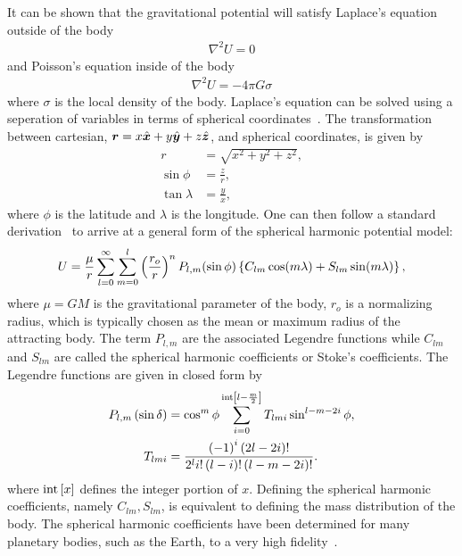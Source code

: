 It can be shown that the gravitational potential will satisfy Laplace's equation outside of the body
\begin{align}
    \nabla^2 U = 0
\end{align}
and Poisson's equation inside of the body
\begin{align}
    \nabla^2 U = - 4 \pi G \sigma
\end{align}
where \( \sigma \) is the local density of the body.
Laplace's equation can be solved using a seperation of variables in terms of spherical coordinates~\cite{scheeres2012a}.
The transformation between cartesian, \( \bm{r} = x \hat{\bm{x}} + y \hat{\bm{y}} + z \hat{\bm{z}}\),  and spherical coordinates, is given by
\begin{subequations}
    \begin{align*}
        r &= \sqrt{x^2 + y^2 + z^2}, \\
        \sin \phi &= \frac{z}{r}, \\
        \tan \lambda &= \frac{y}{x},
    \end{align*}
\end{subequations}
where \( \phi \) is the latitude and \( \lambda\) is the longitude.
One can then follow a standard derivation~\cite{vallado2007} to arrive at a general form of the spherical harmonic potential model:
\begin{align}\label{eq:spherical_harmonic}
    U = \frac{\mu}{r} \sum_{l=0}^\infty \sum_{m=0}^l \left( \frac{r_o}{r} \right)^n P_{l, m}(\sin \phi) \left\{  C_{lm} \cos(m \lambda) + S_{lm} \sin(m \lambda) \right\},
\end{align}
where \( \mu = G M \) is the gravitational parameter of the body, \( r_o\) is a normalizing radius, which is typically chosen as the mean or maximum radius of the attracting body.
The term \( P_{l, m} \) are the associated Legendre functions while \( C_{lm}\) and \( S_{lm}\) are called the spherical harmonic coefficients or Stoke's coefficients. 
The Legendre functions are given in closed form by~\cite{scheeres2012}
\begin{subequations}
\begin{align}
    P_{l, m} \left(  \sin \delta \right) &= \cos^m \phi \sum_{i = 0}^{\text{int}\left[ l - \frac{m}{2} \right]} T_{lmi} \sin^{l - m - 2i} \phi ,  \\
T_{lmi} &= \frac{\left( -1 \right)^i\left( 2l - 2i \right)!}{2^l i! \left( l - i \right)!\left( l - m- 2i \right)!}.
\end{align}
\end{subequations}
where \( \text{int}\left[ x \right]\) defines the integer portion of \( x \).
Defining the spherical harmonic coefficients, namely \( C_{lm}, S_{lm}\), is equivalent to defining the mass distribution of the body.
The spherical harmonic coefficients have been determined for many planetary bodies, such as the Earth, to a very high fidelity~\cite{vallado2007,pavlis2012}.

